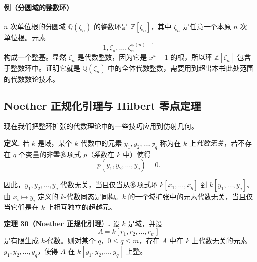 \paragraph{例（分圆域的整数环）}
$n$ 次单位根的分圆域 $\mathbb Q(\zeta_n)$ 的整数环是 $\mathbb Z[\zeta_n]$，其中 $\zeta_n$ 是任意一个本原 $n$ 次单位根。元素
\[
1,\zeta_n,\ldots,\zeta_n^{\varphi(n)-1}
\]
构成一个整基。显然 $\zeta_n$ 是代数整数，因为它是 $x^n-1$ 的根，所以环 $\mathbb Z[\zeta_n]$ 包含于整数环中。证明它就是 $\mathbb Q(\zeta_n)$ 中的全体代数整数，需要用到超出本书此处范围的代数数论技术。

\subsection*{Noether 正规化引理与 Hilbert 零点定理}

现在我们把整环扩张的代数理论中的一些技巧应用到仿射几何。

\noindent\textbf{定义.} 若 $k$ 是域，某个 $k$-代数中的元素 $y_1,y_2,
\ldots,y_q$ 称为在 $k$ 上\emph{代数无关}，若不存在 $q$ 个变量的非零多项式 $p$（系数在 $k$ 中）使得
\[
p(y_1,y_2,
\ldots,y_q)=0.
\]

因此，$y_1,y_2,
\ldots,y_q$ 代数无关，当且仅当从多项式环 $k[x_1,
\ldots,x_q]$ 到 $k[y_1,
\ldots,y_q]$、由 $x_i\mapsto y_i$ 定义的 $k$-代数同态是同构。$k$ 的一个域扩张中的元素代数无关，当且仅当它们是在 $k$ 上相互独立的超越元。

\noindent\textbf{定理 30（Noether 正规化引理）.} 设 $k$ 是域，并设
\[
A=k[r_1,r_2,
\ldots,r_m]
\]
是有限生成 $k$-代数。则对某个 $q$，$0\le q\le m$，存在 $A$ 中在 $k$ 上代数无关的元素 $y_1,y_2,
\ldots,y_q$，使得 $A$ 在 $k[y_1,y_2,
\ldots,y_q]$ 上整。

